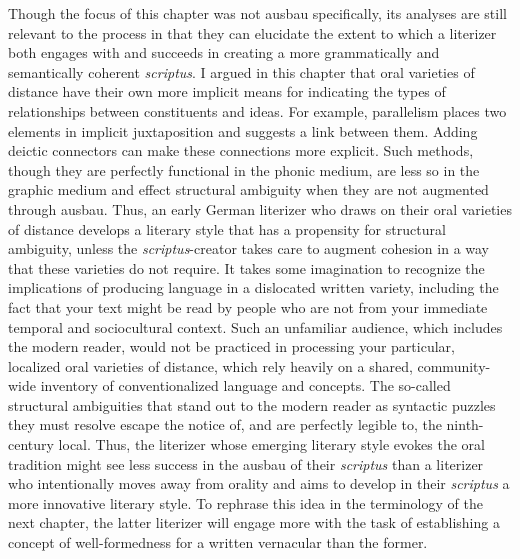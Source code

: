 Though the focus of this chapter was not ausbau specifically, its analyses are still relevant to the process in that they can elucidate the extent to which a literizer both engages with and succeeds in creating a more grammatically and semantically coherent \textit{scriptus}. I argued in this chapter that oral varieties of distance have their own more implicit means for indicating the types of relationships between constituents and ideas. For example, parallelism places two elements in implicit juxtaposition and suggests a link between them. Adding deictic connectors can make these connections more explicit. Such methods, though they are perfectly functional in the phonic medium, are less so in the graphic medium and effect structural ambiguity when they are not augmented through ausbau. Thus, an early German literizer who draws on their oral varieties of distance develops a literary style that has a propensity for structural ambiguity, unless the \textit{scriptus}{}-creator takes care to augment cohesion in a way that these varieties do not require. It takes some imagination to recognize the implications of producing language in a dislocated written variety, including the fact that your text might be read by people who are not from your immediate temporal and sociocultural context. Such an unfamiliar audience, which includes the modern reader, would not be practiced in processing your particular, localized oral varieties of distance, which rely heavily on a shared, community-wide inventory of conventionalized language and concepts. The so-called structural ambiguities that stand out to the modern reader as syntactic puzzles they must resolve escape the notice of, and are perfectly legible to, the ninth-century local. Thus, the literizer whose emerging literary style evokes the oral tradition might see less success in the ausbau of their \textit{scriptus} than a literizer who intentionally moves away from orality and aims to develop in their \textit{scriptus} a more innovative literary style. To rephrase this idea in the terminology of the next chapter, the latter literizer will engage more with the task of establishing a concept of well-formedness for a written vernacular than the former.

